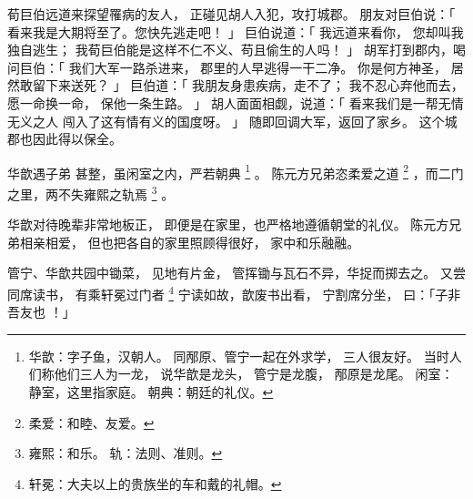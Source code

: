 \begin{paracol}{2}
\switchcolumn

荀巨伯远道来探望罹病的友人，
正碰见胡人入犯，攻打城郡。
朋友对巨伯说：「
    看来我是大期将至了。您快先逃走吧！
」
巨伯说道：「
    我远道来看你，
    您却叫我独自逃生；
    我荀巨伯能是这样不仁不义、苟且偷生的人吗！
」
胡军打到郡内，喝问巨伯：「
    我们大军一路杀进来，
    郡里的人早逃得一干二净。
    你是何方神圣，
    居然敢留下来送死？
」
巨伯道：「
    我朋友身患疾病，走不了；
    我不忍心弃他而去，
    愿一命换一命，
    保他一条生路。
」
胡人面面相觑，说道：「
    看来我们是一帮无情无义之人
    闯入了这有情有义的国度呀。
」
随即回调大军，返回了家乡。
这个城郡也因此得以保全。


\switchcolumn*[\section{}]

华歆遇子弟
甚整，虽闲室之内，严若朝典%
\footnote{%
    华歆：字子鱼，汉朝人。
          同邴原、管宁一起在外求学，
          三人很友好。
          当时人们称他们三人为一龙，
          说华歆是龙头，
          管宁是龙腹，
          邴原是龙尾。
    闲室：静室，这里指家庭。
    朝典：朝廷的礼仪。
}%
。
陈元方兄弟恣柔爱之道%
\footnote{%
    柔爱：和睦、友爱。
}%
，而二门之里，两不失雍熙之轨焉%
\footnote{%
    雍熙：和乐。
    轨：法则、准则。
}%
。

\switchcolumn

华歆对待晚辈非常地板正，
即便是在家里，也严格地遵循朝堂的礼仪。
陈元方兄弟相亲相爱，
但也把各自的家里照顾得很好，
家中和乐融融。


\switchcolumn*[\section{}]

管宁、华歆共园中锄菜，
见地有片金，
管挥锄与瓦石不异，华捉而掷去之。
又尝同席读书，
有乘轩冕过门者%
\footnote{%
    轩冕：大夫以上的贵族坐的车和戴的礼帽。
}%
宁读如故，歆废书出看，
宁割席分坐，
曰：「子非吾友也 ！」

\switchcolumn

\end{paracol}

